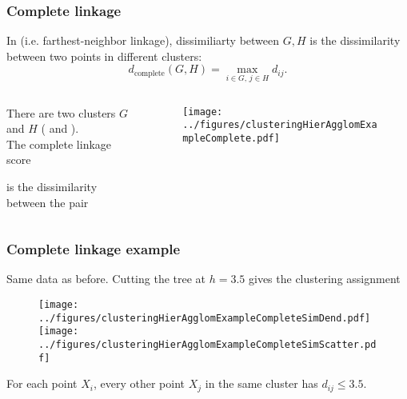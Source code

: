\documentclass{beamer}
\begin{document}
\begin{frame}
\frametitle{Complete linkage}
In  (i.e. farthest-neighbor linkage), dissimiliarty between $G,H$ is the  
dissimilarity between two points in different clusters:
\[
d_{\textrm{complete}}(G,H) = \max_{i \in G,\, j \in H} d_{ij}.
\]
\begin{columns}[T]
\begin{column}{.52\textwidth}
\vsp


 There are two clusters $G$ and $H$ ( and ).  \\ The complete linkage
score 


is the dissimilarity between the  pair 

\end{column}
\begin{column}{.48\textwidth}
\begin{figure}[h!]
  \centering
  \texttt{[image: ../figures/clusteringHierAgglomExampleComplete.pdf]}
\end{figure}
\end{column}
\end{columns}
\end{frame}

\begin{frame}
\frametitle{Complete linkage example}
Same data as before.  Cutting the tree at $h= 3.5$ gives the clustering assignment
\begin{figure}[h!]
  \centering
  \texttt{[image: ../figures/clusteringHierAgglomExampleCompleteSimDend.pdf]}
  \texttt{[image: ../figures/clusteringHierAgglomExampleCompleteSimScatter.pdf]}  
\end{figure}
 For each point $X_i$, every other point $X_j$ in the same cluster has $d_{ij} \leq 3.5$.

\end{frame}
\end{document}

